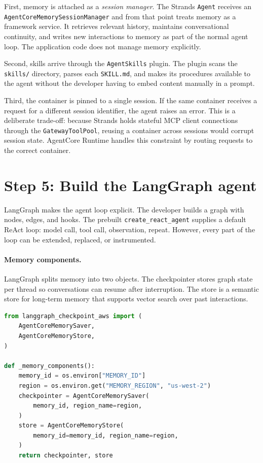 First, memory is attached as a \emph{session manager}. The Strands \texttt{Agent} receives
an \texttt{AgentCoreMemorySessionManager} and from that point treats memory as a framework
service. It retrieves relevant history, maintains conversational continuity, and writes new
interactions to memory as part of the normal agent loop. The application code does not
manage memory explicitly.

Second, skills arrive through the \texttt{AgentSkills} plugin. The plugin scans the
\texttt{skills/} directory, parses each \texttt{SKILL.md}, and makes its procedures
available to the agent without the developer having to embed content manually in a prompt.

Third, the container is pinned to a single session. If the same container receives a
request for a different session identifier, the agent raises an error. This is a deliberate
trade-off: because Strands holds stateful MCP client connections through the
\texttt{GatewayToolPool}, reusing a container across sessions would corrupt session state.
AgentCore Runtime handles this constraint by routing requests to the correct container.

\section{Step 5: Build the LangGraph agent}

LangGraph makes the agent loop explicit. The developer builds a graph with nodes, edges,
and hooks. The prebuilt \texttt{create\_react\_agent} supplies a default ReAct
loop: model call, tool call, observation, repeat. However, every part of the loop can be
extended, replaced, or instrumented.

\paragraph{Memory components.}

LangGraph splits memory into two objects. The checkpointer stores graph state per thread
so conversations can resume after interruption. The store is a semantic store for
long-term memory that supports vector search over past interactions.

\begin{lstlisting}[language=Python]
from langgraph_checkpoint_aws import (
    AgentCoreMemorySaver,
    AgentCoreMemoryStore,
)

def _memory_components():
    memory_id = os.environ["MEMORY_ID"]
    region = os.environ.get("MEMORY_REGION", "us-west-2")
    checkpointer = AgentCoreMemorySaver(
        memory_id, region_name=region,
    )
    store = AgentCoreMemoryStore(
        memory_id=memory_id, region_name=region,
    )
    return checkpointer, store
\end{lstlisting}

